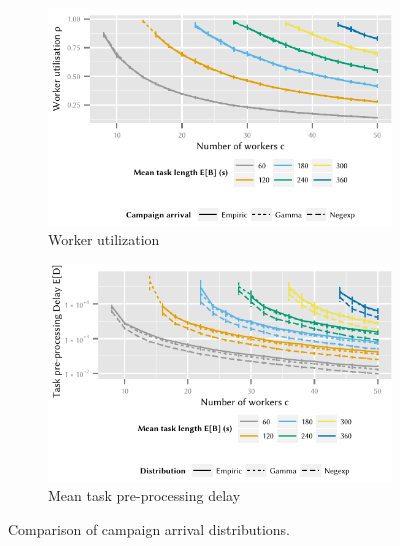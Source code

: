 \begin{figure}
	\centering
	\begin{subfigure}{\columnwidth}
		\includegraphics{cloud/crowdsourcing/measurements/figures/distribution_utilization}
		\caption{Worker utilization \workerUtilization}
		\label{fig:cloud:crowdsourcing:measurements:comparison:distribution:utilization}
	\end{subfigure}

	\begin{subfigure}{\columnwidth}
		\includegraphics{cloud/crowdsourcing/measurements/figures/distribution_task_delay}
		\caption{Mean task pre-processing delay \preTaskProcessingDelay}
		\label{fig:cloud:crowdsourcing:measurements:comparison:distribution:task_delay}
	\end{subfigure}
	\caption{Comparison of campaign arrival distributions.}
	\label{fig:cloud:crowdsourcing:measurements:comparison:distribution}
\end{figure}

